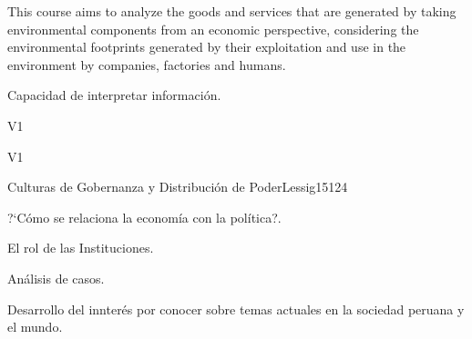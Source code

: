 \begin{syllabus}


\begin{justification}
This course aims to analyze the goods and services that are generated by taking environmental components from an economic perspective, considering the environmental footprints generated by their exploitation and use in the environment by companies, factories and humans.
\end{justification}

\begin{goals}
\item Capacidad de interpretar información.
\end{goals}

\begin{outcomes}{V1}
    \item {}
    \item {}
    \item {}
    
\end{outcomes}

\begin{competences}{V1}
    \item {}
    \item {}
    \item {}
    \item {}
\end{competences}

\begin{unit}{Culturas de Gobernanza y Distribución de Poder}{}{Lessig15}{12}{4}
   \begin{topics}
      \item ?`Cómo se relaciona la economía con la política?.
      \item El rol de las Instituciones.
      \item Análisis de casos.
   \end{topics}
   \begin{learningoutcomes}
      \item Desarrollo del innterés por conocer sobre temas actuales en la sociedad peruana y el mundo.
   \end{learningoutcomes}
\end{unit}

\begin{coursebibliography}
\end{coursebibliography}

\end{syllabus}
